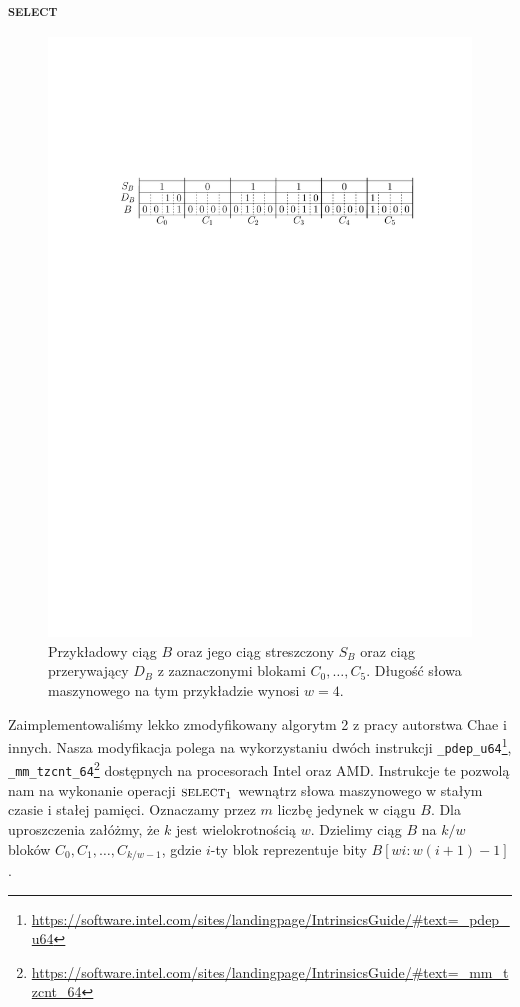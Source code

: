 \subsubsection{\textsc{select}}
\begin{figure}[H]
    \centering
    \includegraphics[scale=0.8]{images/select.pdf}
    \caption{Przykładowy ciąg $B$ oraz jego ciąg streszczony $S_B$ oraz ciąg przerywający $D_B$ z zaznaczonymi blokami $C_0,\dots,C_5$. Długość słowa maszynowego na tym przykładzie wynosi $w=4$.}
    \label{fig:select}
\end{figure}\vspace{-0.5em}
Zaimplementowaliśmy lekko zmodyfikowany algorytm 2 z pracy \cite{nakp09} autorstwa Chae i innych. Nasza modyfikacja polega na wykorzystaniu dwóch instrukcji \lstinline{_pdep_u64}\footnote{\url{https://software.intel.com/sites/landingpage/IntrinsicsGuide/\#text=_pdep_u64}},
\lstinline{_mm_tzcnt_64}\footnote{\url{https://software.intel.com/sites/landingpage/IntrinsicsGuide/\#text=_mm_tzcnt_64}} dostępnych na procesorach Intel oraz AMD. Instrukcje te pozwolą nam na wykonanie operacji $\textsc{select}_1$ wewnątrz słowa maszynowego w stałym czasie i stałej pamięci.
Oznaczamy przez $m$ liczbę jedynek w ciągu $B$. Dla uproszczenia załóżmy, że $k$ jest wielokrotnością $w$. Dzielimy ciąg $B$ na $k/w$ bloków $C_0, C_1, \dots, C_{k/w-1}$, gdzie $i$-ty blok reprezentuje bity $B[wi:w(i+1)-1]$. 

